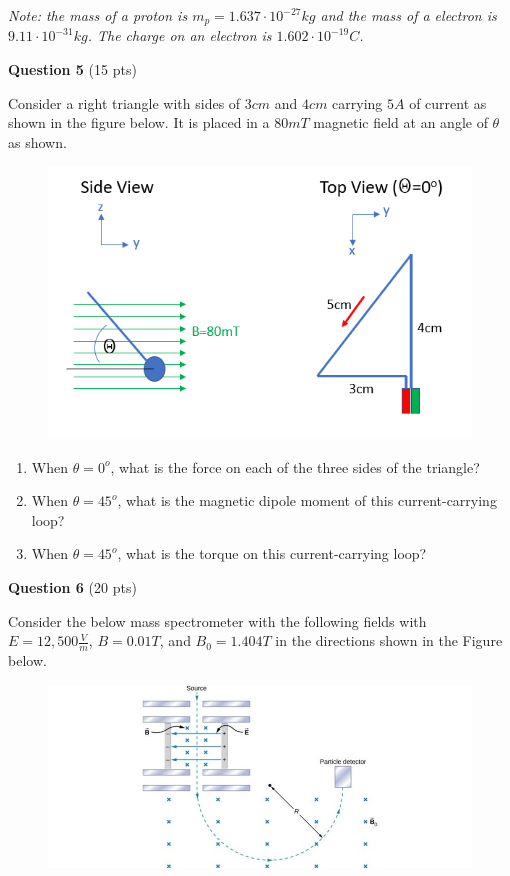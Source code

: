 \documentclass[14pt]{report}
\begin{document}
\textit{Note: the mass of a proton is $m_p = 1.637 \cdot 10^{-27} kg$ and the mass of a electron is $9.11 \cdot 10^{-31} kg$. The charge on an electron is $1.602 \cdot 10^{-19} C$.}

\newpage
\textbf{Question 5} (15 pts)

Consider a right triangle with sides of $3cm$ and $4cm$ carrying $5A$ of current as shown in the figure below. It is placed in a $80mT$ magnetic field at an angle of $\theta$ as shown.

\begin{figure}[H]
\begin{center}
\includegraphics[scale=0.80]{magneticdipole.png}
\end{center}
\end{figure}

\begin{enumerate}[label=\Alph*]
\item When $\theta = 0^o$, what is the force on each of the three sides of the triangle?
\item When $\theta = 45^o$, what is the magnetic dipole moment of this current-carrying loop?
\item When $\theta = 45^o$, what is the torque on this current-carrying loop?
\end{enumerate}



\textbf{Question 6} (20 pts)

Consider the below mass spectrometer with the following fields with $E = 12,500 \frac{V}{m}$, $B = 0.01T$, and $B_0 = 1.404 T$ in the directions shown in the Figure below. 

\begin{figure}[H]
\begin{center}
\includegraphics[scale=0.60]{fig_11_19.jpg}
\end{center}
\end{figure}
\end{document}
